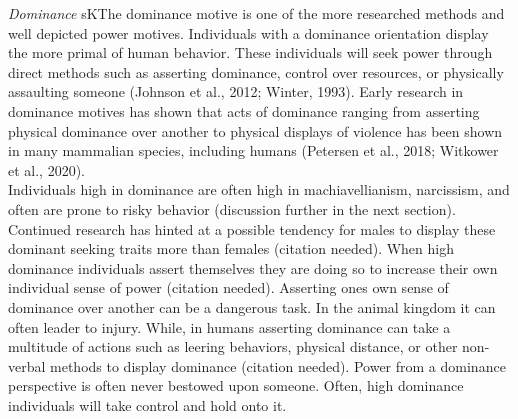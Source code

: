 \documentclass[
  english,
  a4paper]{apa7}
\begin{document}
\emph{Dominance}
sKThe dominance motive is one of the more researched methods and well depicted power motives. Individuals with a dominance orientation display the more primal of human behavior. These individuals will seek power through direct methods such as asserting dominance, control over resources, or physically assaulting someone (Johnson et al., 2012; Winter, 1993). Early research in dominance motives has shown that acts of dominance ranging from asserting physical dominance over another to physical displays of violence has been shown in many mammalian species, including humans (Petersen et al., 2018; Witkower et al., 2020).\\
Individuals high in dominance are often high in machiavellianism, narcissism, and often are prone to risky behavior (discussion further in the next section). Continued research has hinted at a possible tendency for males to display these dominant seeking traits more than females (citation needed). When high dominance individuals assert themselves they are doing so to increase their own individual sense of power (citation needed). Asserting ones own sense of dominance over another can be a dangerous task. In the animal kingdom it can often leader to injury. While, in humans asserting dominance can take a multitude of actions such as leering behaviors, physical distance, or other non-verbal methods to display dominance (citation needed). Power from a dominance perspective is often never bestowed upon someone. Often, high dominance individuals will take control and hold onto it.
\end{document}
